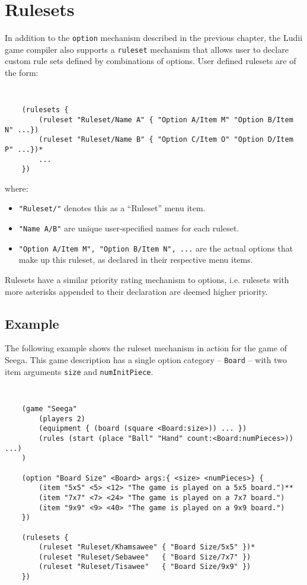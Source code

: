 \chapter{Rulesets}  \label{Chapter:Rulesets}

In addition to the {\tt option} mechanism described in the previous chapter, the Ludii game compiler also supports a {\tt ruleset} mechanism that allows user to declare custom rule sets defined by combinations of options. 
User defined rulesets are of the form:

{\tt
\begin{verbatim}
    (rulesets { 
        (ruleset "Ruleset/Name A" { "Option A/Item M" "Option B/Item N" ...})
        (ruleset "Ruleset/Name B" { "Option C/Item O" "Option D/Item P" ...})*
        ...
    })
\end{verbatim}
}

\noindent
where:
\begin{itemize}
\item {\tt "Ruleset/"} denotes this as a ``Ruleset'' menu item.
\item {\tt "Name A/B"} are unique user-specified names for each ruleset.
\item {\tt "Option A/Item M",  "Option B/Item N", ...} are the actual options that make up this ruleset, as declared in their respective menu items.
\end{itemize}

Rulesets have a similar priority rating mechanism to options, i.e. rulesets with more asterisks appended to their declaration are deemed higher priority.


\section{Example}

The following example shows the ruleset mechanism in action for the game of Seega. 
This game description has a single option category -- {\tt Board}  -- with two item arguments {\tt size} and {\tt numInitPiece}.  

{\tt
\begin{verbatim}
    (game "Seega"  
        (players 2)  
        (equipment { (board (square <Board:size>)) ... }) 
        (rules (start (place "Ball" "Hand" count:<Board:numPieces>)) ...)
    )

    (option "Board Size" <Board> args:{ <size> <numPieces>} {
        (item "5x5" <5> <12> "The game is played on a 5x5 board.")**   
        (item "7x7" <7> <24> "The game is played on a 7x7 board.")   
        (item "9x9" <9> <40> "The game is played on a 9x9 board.")   
    })

    (rulesets { 
        (ruleset "Ruleset/Khamsawee" { "Board Size/5x5" })*
        (ruleset "Ruleset/Sebawee"   { "Board Size/7x7" })
        (ruleset "Ruleset/Tisawee"   { "Board Size/9x9" })
    })
\end{verbatim}
}

